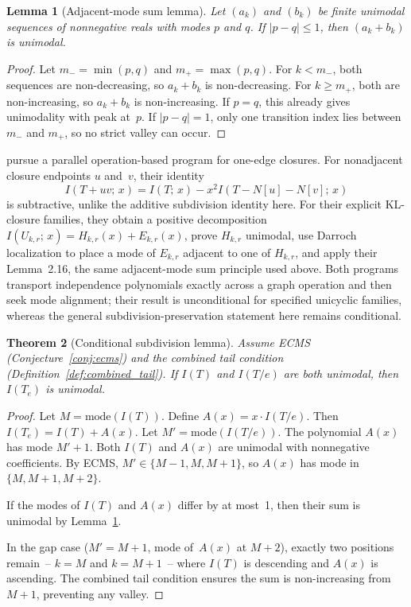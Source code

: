 \documentclass[12pt,oneside]{article}
\newtheorem{theorem}{Theorem}[section]
\newtheorem{lemma}[theorem]{Lemma}
\theoremstyle{remark}
\begin{document}
\begin{lemma}[Adjacent-mode sum lemma]\label{lem:adjacent-mode-sum}
  Let $(a_k)$ and $(b_k)$ be finite unimodal sequences of nonnegative reals with modes $p$ and $q$.
  If $|p-q| \le 1$, then $(a_k+b_k)$ is unimodal.
\end{lemma}

\begin{proof}
  Let $m_-=\min(p,q)$ and $m_+=\max(p,q)$.
  For $k<m_-$, both sequences are non-decreasing, so $a_k+b_k$ is non-decreasing.
  For $k\ge m_+$, both are non-increasing, so $a_k+b_k$ is non-increasing.
  If $p=q$, this already gives unimodality with peak at~$p$.
  If $|p-q|=1$, only one transition index lies between $m_-$ and $m_+$, so no strict valley can occur.
\end{proof}

\textcite{levitkadrawi2026} pursue a parallel operation-based program for one-edge closures.
For nonadjacent closure endpoints $u$ and~$v$, their identity
\[
  I(T+uv;\,x)=I(T;\,x)-x^2I(T-N[u]-N[v];\,x)
\]
is subtractive, unlike the additive subdivision identity here.
For their explicit KL-closure families, they obtain a positive decomposition $I(U_{k,r};\,x)=H_{k,r}(x)+E_{k,r}(x)$, prove $H_{k,r}$ unimodal, use Darroch localization to place a mode of $E_{k,r}$ adjacent to one of $H_{k,r}$, and apply their Lemma~2.16, the same adjacent-mode sum principle used above.
Both programs transport independence polynomials exactly across a graph operation and then seek mode alignment; their result is unconditional for specified unicyclic families, whereas the general subdivision-preservation statement here remains conditional.

\begin{theorem}[Conditional subdivision lemma]\label{thm:conditional}
  Assume ECMS (Conjecture~\ref{conj:ecms}) and the combined tail condition (Definition~\ref{def:combined_tail}).
  If $I(T)$ and $I(T/e)$ are both unimodal, then $I(T_e)$ is unimodal.
\end{theorem}

\begin{proof}
Let $M = \mathrm{mode}(I(T))$.
Define $A(x) = x \cdot I(T/e)$.
Then $I(T_e) = I(T) + A(x)$.
Let $M' = \mathrm{mode}(I(T/e))$.
The polynomial $A(x)$ has mode $M' + 1$.
Both $I(T)$ and $A(x)$ are unimodal with nonnegative coefficients.
By ECMS, $M' \in \{M{-}1, M, M{+}1\}$, so $A(x)$ has mode in $\{M, M{+}1, M{+}2\}$.

If the modes of $I(T)$ and $A(x)$ differ by at most~1, then their sum is unimodal by Lemma~\ref{lem:adjacent-mode-sum}.

In the gap case ($M' = M + 1$, mode of~$A(x)$ at $M + 2$), exactly two positions remain~-- $k = M$ and $k = M{+}1$~-- where $I(T)$ is descending and $A(x)$ is ascending.
The combined tail condition ensures the sum is non-increasing from $M + 1$, preventing any valley.
\end{proof}
\end{document}
